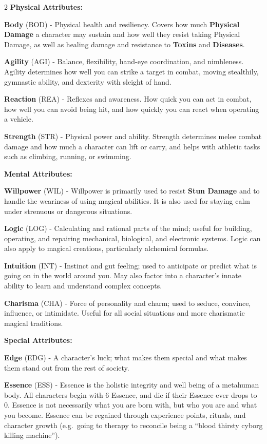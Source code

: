 \documentclass[
  oneside]{article}
\begin{document}
\begin{multicols}{2}
\textbf{Physical Attributes:}

\textbf{Body} (BOD) - Physical health and
resiliency. Covers how much \textbf{Physical
Damage} a character may sustain and how well they
resist taking Physical Damage, as well as healing
damage and resistance to \textbf{Toxins} and
\textbf{Diseases}.

\textbf{Agility} (AGI) - Balance, flexibility,
hand-eye coordination, and nimbleness. Agility
determines how well you can strike a target in
combat, moving stealthily, gymnastic ability, and
dexterity with sleight of hand.

\textbf{Reaction} (REA) - Reflexes and awareness.
How quick you can act in combat, how well you can
avoid being hit, and how quickly you can react
when operating a vehicle.

\textbf{Strength} (STR) - Physical power and
ability. Strength determines melee combat damage
and how much a character can lift or carry, and
helps with athletic tasks such as climbing,
running, or swimming.

\textbf{Mental Attributes:}

\textbf{Willpower} (WIL) - Willpower is primarily
used to resist \textbf{Stun Damage} and to handle
the weariness of using magical abilities. It is
also used for staying calm under strenuous or
dangerous situations.

\textbf{Logic} (LOG) - Calculating and rational
parts of the mind; useful for building, operating,
and repairing mechanical, biological, and
electronic systems. Logic can also apply to
magical creations, particularly alchemical
formulas.

\textbf{Intuition} (INT) - Instinct and gut
feeling; used to anticipate or predict what is
going on in the world around you. May also factor
into a character's innate ability to learn and
understand complex concepts.

\textbf{Charisma} (CHA) - Force of personality and
charm; used to seduce, convince, influence, or
intimidate. Useful for all social situations and
more charismatic magical traditions.

\textbf{Special Attributes:}

\textbf{Edge} (EDG) - A character's luck; what
makes them special and what makes them stand out
from the rest of society.

\textbf{Essence} (ESS) - Essence is the holistic
integrity and well being of a metahuman body. All
characters begin with 6 Essence, and die if their
Essence ever drops to 0. Essence is not
necessarily what you are born with, but who you
are and what you become. Essence can be regained
through experience points, rituals, and character
growth (e.g.~going to therapy to reconcile being a
``blood thirsty cyborg killing machine'').


\end{multicols}
\end{document}
